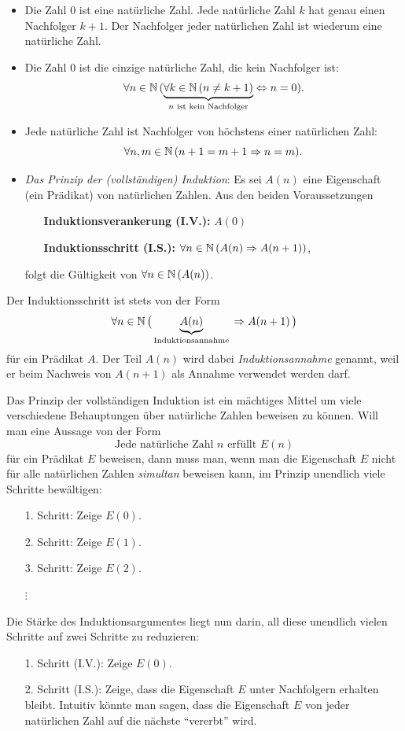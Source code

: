 \begin{itemize}
 \item Die Zahl $0$ ist eine natürliche Zahl. Jede natürliche Zahl $k$ hat genau einen Nachfolger $k+1$. Der Nachfolger jeder natürlichen Zahl ist wiederum eine natürliche Zahl.
 \item Die Zahl $0$ ist die einzige natürliche Zahl, die kein Nachfolger ist:
 \[
 \forall n\in\mathbb{N}\,(\underbrace{\forall k\in\mathbb{N}\,(n\neq k+1)}_{n\text{ ist kein Nachfolger}}\Leftrightarrow n=0 ).
 \]
 \item Jede natürliche Zahl ist Nachfolger von höchstens einer natürlichen Zahl:
 \[
 \forall n,m\in\mathbb{N}\,(n+1=m+1\Rightarrow n=m).
 \]
\item \textit{Das Prinzip der (vollständigen) Induktion}: Es sei $A(n)$ eine Eigenschaft (ein Prädikat) von natürlichen Zahlen. Aus den beiden Voraussetzungen
\begin{itemize}
\item[] \textbf{Induktionsverankerung (I.V.):} $A(0)$
\item[] \textbf{Induktionsschritt (I.S.):} $\forall n\in \mathbb{N}\,(A(n)\Rightarrow A(n+1))$,
\end{itemize}
folgt die Gültigkeit von $\forall n\in\mathbb{N}\,(A(n))$.
\end{itemize}

\begin{rk}
Der Induktionsschritt ist stets von der Form
\[
\forall n\in\mathbb{N}\,\big( \underbrace{A(n)}_{\text{Induktionsannahme}}\,\Rightarrow A(n+1)\,\big)
\]
für ein Prädikat $A$. Der Teil $A(n)$ wird dabei \textit{Induktionsannahme} genannt, weil er beim Nachweis von $A(n+1)$ als Annahme verwendet werden darf.
\end{rk}

\begin{rk}
Das Prinzip der vollständigen Induktion ist ein mächtiges Mittel um viele verschiedene Behauptungen über natürliche Zahlen beweisen zu können. Will man eine Aussage von der Form
\[
\text{Jede natürliche Zahl }n\text{ erfüllt }E(n)
\]
für ein Prädikat $E$ beweisen, dann muss man, wenn man die Eigenschaft $E$ nicht für alle natürlichen Zahlen \textit{simultan} beweisen kann, im Prinzip unendlich viele Schritte bewältigen:
\begin{enumerate}
\item[1.] Schritt: Zeige $E(0)$.
\item[2.] Schritt: Zeige $E(1)$.
\item[3.] Schritt: Zeige $E(2)$.
\item[$\vdots$]
\end{enumerate}
Die Stärke des Induktionsargumentes liegt nun  darin, all diese unendlich vielen Schritte auf zwei Schritte zu reduzieren:
\begin{enumerate}
\item[1.] Schritt (I.V.): Zeige $E(0)$.
\item[2.] Schritt (I.S.): Zeige, dass die Eigenschaft $E$ unter Nachfolgern erhalten bleibt. Intuitiv könnte man sagen, dass die Eigenschaft $E$ von jeder natürlichen Zahl auf die nächste ``vererbt'' wird.
\end{enumerate}
\end{rk}

